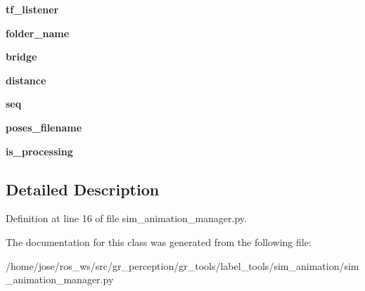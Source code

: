 \begin{DoxyCompactItemize}
{\bfseries tf\+\_\+listener}
\item 
\mbox{\label{classsim__animation_1_1sim__animation__manager_1_1SimAnimationManager_ab14fb7ad96b9288939061f258149e8a9}} 
{\bfseries folder\+\_\+name}
\item 
\mbox{\label{classsim__animation_1_1sim__animation__manager_1_1SimAnimationManager_a785d1998268aff2c223c805dc3f8bd68}} 
{\bfseries bridge}
\item 
\mbox{\label{classsim__animation_1_1sim__animation__manager_1_1SimAnimationManager_aa48785e594c26b37e894fae33a8f47ea}} 
{\bfseries distance}
\item 
\mbox{\label{classsim__animation_1_1sim__animation__manager_1_1SimAnimationManager_a8d5a43165fd71208230c3045edd82b57}} 
{\bfseries seq}
\item 
\mbox{\label{classsim__animation_1_1sim__animation__manager_1_1SimAnimationManager_a430c48a453e3be00594c13beff6475b9}} 
{\bfseries poses\+\_\+filename}
\item 
\mbox{\label{classsim__animation_1_1sim__animation__manager_1_1SimAnimationManager_aaee0d8a252190498914480d781adb161}} 
{\bfseries is\+\_\+processing}
\end{DoxyCompactItemize}


\subsection{Detailed Description}


Definition at line 16 of file sim\+\_\+animation\+\_\+manager.\+py.



The documentation for this class was generated from the following file\+:\begin{DoxyCompactItemize}
\item 
/home/jose/ros\+\_\+ws/src/gr\+\_\+perception/gr\+\_\+tools/label\+\_\+tools/sim\+\_\+animation/sim\+\_\+animation\+\_\+manager.\+py\end{DoxyCompactItemize}
